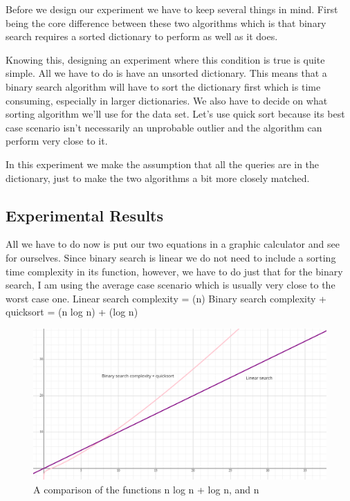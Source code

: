 \documentclass{article}
\begin{document}
Before we design our experiment we have to keep several things in mind. First being the core difference between these two algorithms which is that binary search requires a sorted dictionary to perform as well as it does.

Knowing this, designing an experiment where this condition is true is quite simple. All we have to do is have an unsorted dictionary. This means that a binary search algorithm will have to sort the dictionary first which is time consuming, especially in larger dictionaries. We also have to decide on what sorting algorithm we'll use for the data set. Let's use quick sort because its best case scenario isn't necessarily an unprobable outlier and the algorithm can perform very close to it.

In this experiment we make the assumption that all the queries are in the dictionary, just to make the two algorithms a bit more closely matched.


\subsection{Experimental Results}

All we have to do now is put our two equations in a graphic calculator and see for ourselves. Since binary search is linear we do not need to include a sorting time complexity in its function, however, we have to do just that for the binary search, I am using the average case scenario which is usually very close to the worst case one.
Linear search complexity = \Theta(n)
Binary search complexity + quicksort = \Theta(n log n) + \Theta(log n)

\begin{figure}[h]
\caption{A comparison of the functions n log n + log n, and n}
\includegraphics{graph1.png}
\centering
\end{figure}
\end{document}
